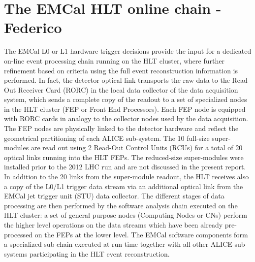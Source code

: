 

\section{The EMCal HLT online chain -  Federico}

The EMCal L0 or L1 hardware trigger decisions provide the input 
for a dedicated on-line event processing chain running on the HLT cluster,
where further refinement based on criteria using the full event reconstruction 
information is performed.
In fact, the detector optical link transports the raw data to the 
Read-Out Receiver Card (RORC) in the local data collector of the data acquisition system, 
which sends a complete copy of the readout 
to a set of specialized nodes in the HLT cluster (FEP or Front End Processors).
Each FEP node is equipped with RORC cards in analogy to
the collector nodes used by the data acquisition.
The FEP nodes are physically linked to the detector hardware and reflect the geometrical
partitioning of each ALICE sub-system. 
The 10 full-size super-modules are read out using 2 Read-Out Control Units (RCUs) for a total
of 20 optical links running into the HLT FEPs. 
The reduced-size super-modules were installed prior to the 2012 LHC run and are not discussed in the present report.
In addition to the 20 links from the super-module readout, the HLT receives also a copy of the L0/L1 trigger data stream 
via an additional optical link from the EMCal jet trigger unit (STU) data collector.
The different stages of data processing are then performed by the 
software analysis chain executed on the HLT cluster:
a set of general purpose nodes (Computing Nodes or CNs) 
perform the higher level operations on the data streams which have been
already pre-processed on the FEPs at the lower level.
The EMCal software components form a specialized sub-chain 
executed at run time together with all other ALICE sub-systems
participating in the HLT event reconstruction. 

